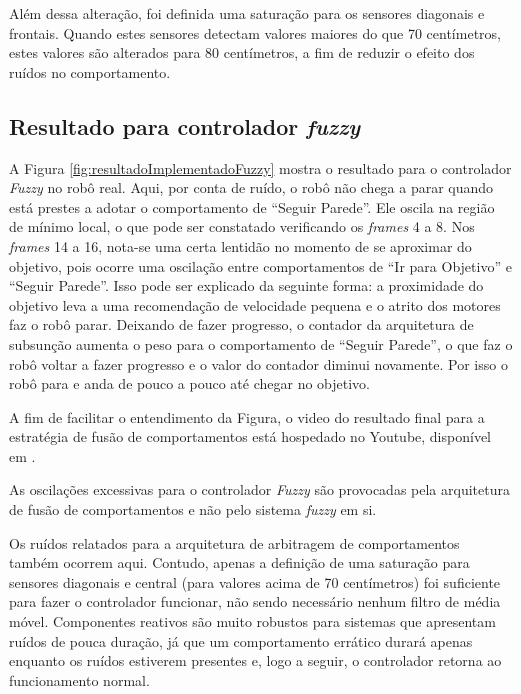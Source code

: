 	Além dessa alteração, foi definida uma saturação para os sensores diagonais e frontais. Quando estes sensores
	detectam valores maiores do que 70 centímetros, estes valores são alterados para 80 centímetros, a fim de
	reduzir o efeito dos ruídos no comportamento.  
	
	\subsection{Resultado para controlador \textit{fuzzy}}

	A Figura \ref{fig:resultadoImplementadoFuzzy} mostra o resultado para o controlador \textit{Fuzzy} no robô 
	real. Aqui, por conta de ruído, o robô não chega a parar quando está prestes a adotar o comportamento de 
	``Seguir Parede''. Ele oscila na região de mínimo local, o que pode ser constatado verificando os 
	\textit{frames} 4 a 8. Nos \textit{frames} 14 a 16, nota-se uma certa lentidão no momento de se aproximar do
	objetivo, pois ocorre uma oscilação entre comportamentos de ``Ir para Objetivo'' e ``Seguir Parede''. Isso 
	pode ser explicado da seguinte forma: a proximidade do objetivo leva a uma recomendação de velocidade pequena e
	o atrito dos motores faz o robô parar. Deixando de fazer progresso, o contador da arquitetura de subsunção 
	aumenta o peso para o comportamento de ``Seguir Parede'', o que faz o robô voltar a fazer progresso e o 
	valor do contador diminui novamente. Por isso o robô para e anda de pouco a pouco até chegar no objetivo.
	
	

	A fim de facilitar o entendimento da Figura, o video do resultado final para a 
	estratégia de fusão de comportamentos está hospedado no Youtube, disponível em 
	.
		
	As oscilações excessivas para o controlador \textit{Fuzzy} são provocadas pela arquitetura de fusão de 
	comportamentos e não pelo sistema \textit{fuzzy} em si.
	
	Os ruídos relatados para a arquitetura de arbitragem de comportamentos também ocorrem aqui. Contudo, apenas 
	a definição de uma saturação para sensores diagonais e central (para valores acima de 70 centímetros) foi 
	suficiente para fazer o controlador funcionar, não sendo necessário nenhum filtro de média móvel. Componentes 
	reativos são muito robustos para sistemas que apresentam ruídos de pouca duração, já que um comportamento 
	errático durará apenas enquanto os ruídos estiverem presentes e, logo a seguir, o controlador retorna ao 
	funcionamento normal.
	
%
